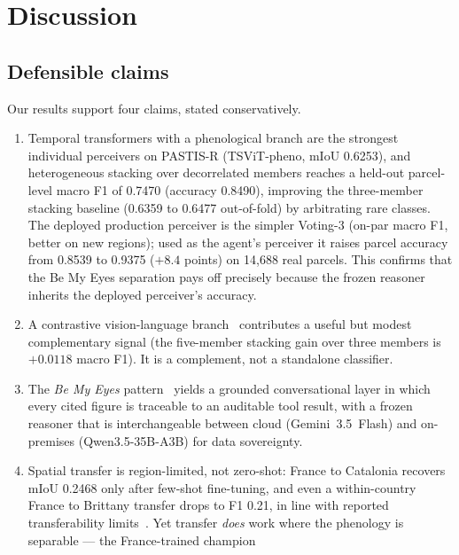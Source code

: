 \section{Discussion}
\label{sec:discussion}

\subsection{Defensible claims}
Our results support four claims, stated conservatively.
\begin{enumerate}[leftmargin=*]
    \item Temporal transformers with a phenological branch are the
    strongest individual perceivers on PASTIS-R (TSViT-pheno, mIoU
    0.6253), and heterogeneous stacking over decorrelated members
    reaches a held-out parcel-level macro F1 of 0.7470
    (accuracy 0.8490), improving the three-member stacking baseline
    (0.6359 to 0.6477 out-of-fold) by arbitrating rare classes. The
    deployed production perceiver is the simpler Voting-3 (on-par macro
    F1, better on new regions); used as the agent's perceiver it raises
    parcel accuracy from 0.8539 to 0.9375 ($+8.4$ points) on 14{,}688 real
    parcels. This confirms that the Be My Eyes separation pays off
    precisely because the frozen reasoner inherits the deployed
    perceiver's accuracy.
    \item A contrastive vision-language branch~\cite{li2025farslip}
    contributes a useful but modest complementary signal (the
    five-member stacking gain over three members is $+0.0118$ macro
    F1). It is a complement, not a standalone classifier.
    \item The \emph{Be My Eyes} pattern~\cite{huang2025bemyeyes} yields
    a grounded conversational layer in which every cited figure is
    traceable to an auditable tool result, with a frozen reasoner that
    is interchangeable between cloud (Gemini~3.5~Flash) and on-premises
    (Qwen3.5-35B-A3B) for data sovereignty.
    \item Spatial transfer is region-limited, not zero-shot: France to
    Catalonia recovers mIoU 0.2468 only after few-shot fine-tuning, and
    even a within-country France to Brittany transfer drops to F1 0.21,
    in line with reported transferability
    limits~\cite{harvesting2026alphaearth}. Yet transfer \emph{does}
    work where the phenology is separable --- the France-trained champion

\end{enumerate}
